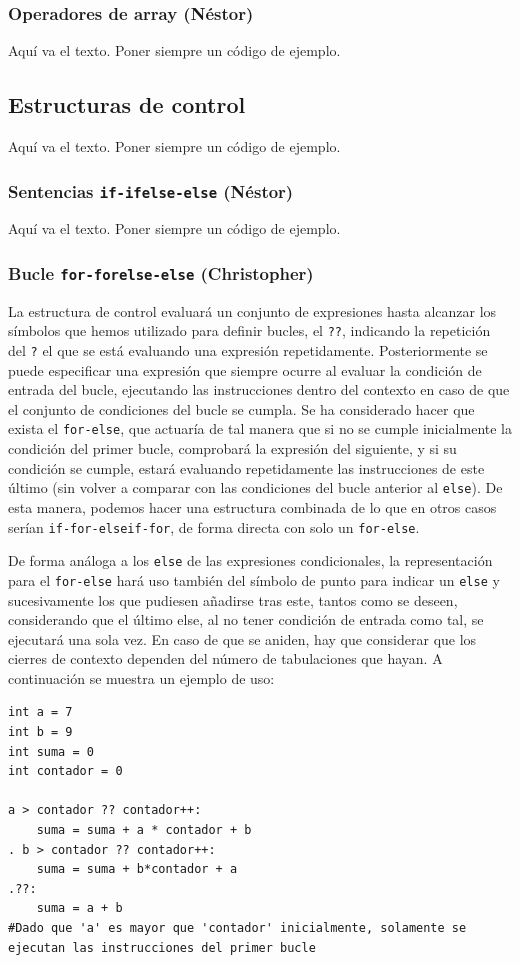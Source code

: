 \documentclass[11pt, english]{article}
\begin{document}
\subsubsection{Operadores de array (Néstor)}
Aquí va el texto. Poner siempre un código de ejemplo.
\newpage

\subsection{Estructuras de control}
Aquí va el texto. Poner siempre un código de ejemplo.

\subsubsection{Sentencias \texttt{if-ifelse-else} (Néstor)}
Aquí va el texto. Poner siempre un código de ejemplo.

\subsubsection{Bucle \texttt{for-forelse-else} (Christopher)}
La estructura de control evaluará un conjunto de expresiones hasta alcanzar los símbolos que hemos utilizado para definir bucles, el \texttt{??}, indicando la repetición del \texttt{?} el que se está evaluando una expresión repetidamente. Posteriormente se puede especificar una expresión que siempre ocurre al evaluar la condición de entrada del bucle, ejecutando las instrucciones dentro del contexto en caso de que el conjunto de condiciones del bucle se cumpla. Se ha considerado hacer que exista el \texttt{for-else}, que actuaría de tal manera que si no se cumple inicialmente la condición del primer bucle, comprobará la expresión del siguiente, y si su condición se cumple, estará evaluando repetidamente las instrucciones de este último (sin volver a comparar con las condiciones del bucle anterior al \texttt{else}). De esta manera, podemos hacer una estructura combinada de lo que en otros casos serían \texttt{if-for-elseif-for}, de forma directa con solo un \texttt{for-else}. \vspace{10px}

De forma análoga a los \texttt{else} de las expresiones condicionales, la representación para el \texttt{for-else} hará uso también del símbolo de punto para indicar un \texttt{else} y sucesivamente los que pudiesen añadirse tras este, tantos como se deseen, considerando que el último else, al no tener condición de entrada como tal, se ejecutará una sola vez. En caso de que se aniden, hay que considerar que los cierres de contexto dependen del número de tabulaciones que hayan. A continuación se muestra un ejemplo de uso:
\begin{lstlisting}[frame=single]
int a = 7
int b = 9
int suma = 0
int contador = 0

a > contador ?? contador++:
	suma = suma + a * contador + b
. b > contador ?? contador++:
	suma = suma + b*contador + a
.??:
	suma = a + b	
#Dado que 'a' es mayor que 'contador' inicialmente, solamente se ejecutan las instrucciones del primer bucle
\end{lstlisting}
\end{document}
